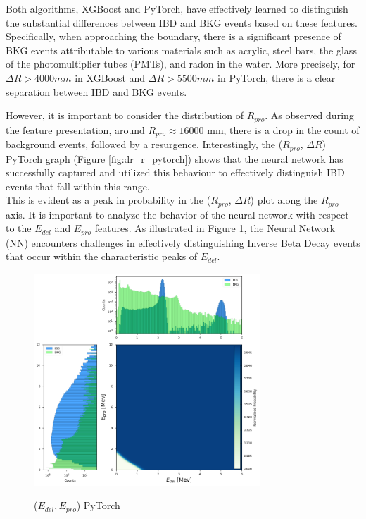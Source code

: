 Both algorithms, XGBoost and PyTorch, have effectively learned to distinguish the substantial differences between IBD and BKG events based on these features. Specifically, when approaching the boundary, there is a significant presence of BKG events attributable to various materials such as acrylic, steel bars, the glass of the photomultiplier tubes (PMTs), and radon in the water. More precisely, for $\Delta R > 4000 mm$ in XGBoost and $\Delta R > 5500 mm$ in PyTorch, there is a clear separation between IBD and BKG events.

However, it is important to consider the distribution of $R_{pro}$. As observed during the feature presentation, around $R_{pro} \approx 16000$ mm, there is a drop in the count of background events, followed by a resurgence. 
Interestingly, the ($R_{pro}$, $\Delta R$) PyTorch graph (Figure \ref{fig:dr_r_pytorch}) shows that the neural network has successfully captured and utilized this behaviour to effectively distinguish IBD events that fall within this range.\\


This is evident as a peak in probability in the ($R_{pro}$, $\Delta R$) plot along the $R_{pro}$ axis.
It is important to analyze the behavior of the neural network with respect to the $E_{del}$ and $E_{pro}$ features.
As illustrated in Figure \ref{fig:e_del_e_pro_pytorch}, the Neural Network (NN) encounters challenges in effectively distinguishing Inverse Beta Decay events that occur within the characteristic peaks of $E_{del}$.

\begin{figure}
	\caption{($E_{del}, E_{pro}$) PyTorch}
	\vspace{-0.2\baselineskip}
	\includegraphics[width=8.5cm]{Images/e_del_e_pro_pytorch}
	\label{fig:e_del_e_pro_pytorch}
	\vspace{-0.5cm}
\end{figure}


